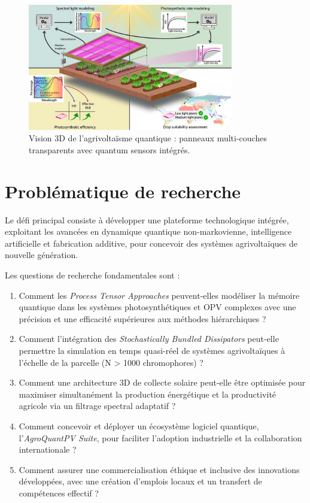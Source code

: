 \documentclass[12pt, a4paper]{article}
\begin{document}
\begin{figure}[htb]
    \centering
    \includegraphics[width=0.8\textwidth]{agri-photovoltaic.jpg}
    \caption{Vision 3D de l'agrivoltaïsme quantique : panneaux multi-couches transparents avec quantum sensors intégrés.}
    \label{fig_agrivoltaic_3d}
\end{figure}

\section{Problématique de recherche}

Le défi principal consiste à développer une plateforme technologique intégrée, exploitant les avancées en dynamique quantique non-markovienne, intelligence artificielle et fabrication additive, pour concevoir des systèmes agrivoltaïques de nouvelle génération.

Les questions de recherche fondamentales sont :
\begin{enumerate}
  \item Comment les \textit{Process Tensor Approaches} peuvent-elles modéliser la mémoire quantique dans les systèmes photosynthétiques et OPV complexes avec une précision et une efficacité supérieures aux méthodes hiérarchiques ?

  \item Comment l'intégration des \textit{Stochastically Bundled Dissipators} peut-elle permettre la simulation en temps quasi-réel de systèmes agrivoltaïques à l'échelle de la parcelle (N > \num{1000} chromophores) ?

  \item Comment une architecture 3D de collecte solaire peut-elle être optimisée pour maximiser simultanément la production énergétique et la productivité agricole via un filtrage spectral adaptatif ?

  \item Comment concevoir et déployer un écosystème logiciel quantique, l'\textit{AgroQuantPV Suite}, pour faciliter l'adoption industrielle et la collaboration internationale ?

  \item Comment assurer une commercialisation éthique et inclusive des innovations développées, avec une création d'emplois locaux et un transfert de compétences effectif ?
\end{enumerate}
\end{document}
